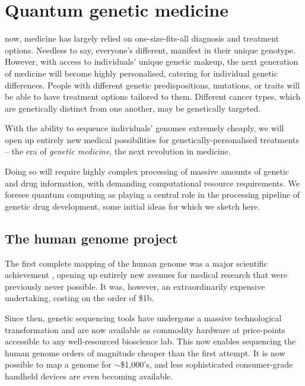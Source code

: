 %
%

\section{Quantum genetic medicine}

 now, medicine has largely relied on one-size-fits-all diagnosis and treatment options. Needless to say, everyone's different, manifest in their unique genotype. However, with access to individuals' unique genetic makeup, the next generation of medicine will become highly personalised, catering for individual genetic differences. People with different genetic predispositions, mutations, or traits will be able to have treatment options tailored to them. Different cancer types, which are genetically distinct from one another, may be genetically targeted.

With the ability to sequence individuals' genomes extremely cheaply, we will open up entirely new medical possibilities for genetically-personalised treatments -- the era of \textit{genetic medicine}, the next revolution in medicine.

Doing so will require highly complex processing of massive amounts of genetic and drug information, with demanding computational resource requirements. We foresee quantum computing as playing a central role in the processing pipeline of genetic drug development, some initial ideas for which we sketch here.

%
%

\subsection{The human genome project}

The first complete mapping of the human genome was a major scientific achievement \cite{humanGenomeProject}, opening up entirely new avenues for medical research that were previously never possible. It was, however, an extraordinarily expensive undertaking, costing on the order of \$1b.

Since then, genetic sequencing tools have undergone a massive technological transformation and are now available as commodity hardware at price-points accessible to any well-resourced bioscience lab. This now enables sequencing the human genome orders of magnitude cheaper than the first attempt. It is now possible to map a genome for $\sim$\$1,000's, and less sophisticated consumer-grade handheld devices are even becoming available.

